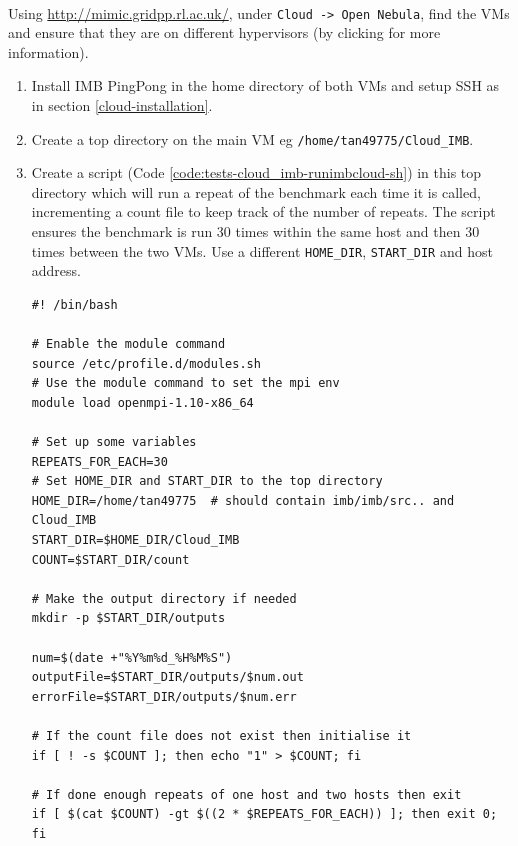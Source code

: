 \documentclass{article}
\newenvironment{code}{\captionsetup{type=listing}}{}
\begin{document}
            \paragraph{}
            Using \url{http://mimic.gridpp.rl.ac.uk/}, under \verb|Cloud -> Open Nebula|, find the VMs and ensure that they are on different hypervisors (by clicking for more information).

            \begin{enumerate}
                \item Install IMB PingPong in the home directory of both VMs and setup SSH as in section \ref{cloud-installation}.
                \item Create a top directory on the main VM eg \verb|/home/tan49775/Cloud_IMB|.
                \item Create a script (Code \ref{code:tests-cloud_imb-runimbcloud-sh}) in this top directory which will run a repeat of the benchmark each time it is called, incrementing a count file to keep track of the number of repeats. The script ensures the benchmark is run 30 times within the same host and then 30 times between the two VMs. Use a different \verb|HOME_DIR|, \verb|START_DIR| and host address.
                    \begin{code}
                    \label{code:tests-cloud_imb-runimbcloud-sh}
                    \begin{verbatim}
#! /bin/bash

# Enable the module command
source /etc/profile.d/modules.sh
# Use the module command to set the mpi env
module load openmpi-1.10-x86_64

# Set up some variables
REPEATS_FOR_EACH=30
# Set HOME_DIR and START_DIR to the top directory
HOME_DIR=/home/tan49775  # should contain imb/imb/src.. and Cloud_IMB
START_DIR=$HOME_DIR/Cloud_IMB
COUNT=$START_DIR/count

# Make the output directory if needed
mkdir -p $START_DIR/outputs

num=$(date +"%Y%m%d_%H%M%S")
outputFile=$START_DIR/outputs/$num.out
errorFile=$START_DIR/outputs/$num.err

# If the count file does not exist then initialise it
if [ ! -s $COUNT ]; then echo "1" > $COUNT; fi

# If done enough repeats of one host and two hosts then exit
if [ $(cat $COUNT) -gt $((2 * $REPEATS_FOR_EACH)) ]; then exit 0; fi


\end{verbatim}
\end{code}
\end{enumerate}
\end{document}
